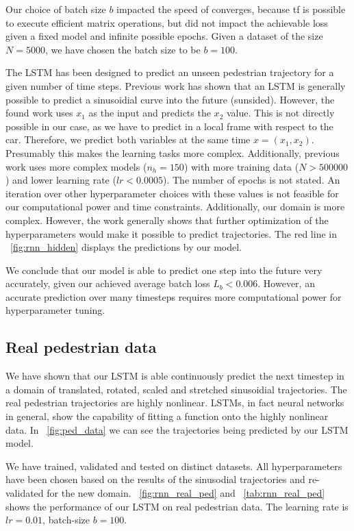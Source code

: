 Our choice of batch size $b$ impacted the speed of converges, because tf is possible to execute efficient matrix operations, but did not impact the achievable loss given a fixed model and infinite possible epochs. Given a dataset of the size $N=5000$, we have chosen the batch size to be $b=100$.

The LSTM has been designed to predict an unseen pedestrian trajectory for a given number of time steps. Previous work has shown that an LSTM is generally possible to predict a sinusoidial curve into the future (sunsided). However, the found work uses $x_1$ as the input and predicts the $x_2$ value. This is not directly possible in our case, as we have to predict in a local frame with respect to the car. Therefore, we predict both variables at the same time $x = (x_1, x_2)$. Presumably this makes the learning tasks more complex. Additionally, previous work uses more complex models ($n_h=150$) with more training data ($N>500000$) and lower learning rate ($lr<0.0005$). The number of epochs is not stated. An iteration over other hyperparameter choices with these values is not feasible for our computational power and time constraints. Additionally, our domain is more complex. However, the work generally shows that further optimization of the hyperparameters would make it possible to predict trajectories. The red line in ~\cref{fig:rnn_hidden} displays the predictions by our model. 

We conclude that our model is able to predict one step into the future very accurately, given our achieved average batch loss $L_b<0.006$. However, an accurate prediction over many timesteps requires more computational power for hyperparameter tuning. 

\subsection{Real pedestrian data}

We have shown that our LSTM is able continuously predict the next timestep in a domain of translated, rotated, scaled and stretched sinusoidial trajectories. The real pedestrian trajectories are highly nonlinear. LSTMs, in fact neural networks in general, show the capability of fitting a function onto the highly nonlinear data. In ~\cref{fig:ped_data} we can see the trajectories being predicted by our LSTM model.

We have trained, validated and tested on distinct datasets. All hyperparameters have been chosen based on the results of the sinusodial trajectories and re-validated for the new domain. ~\cref{fig:rnn_real_ped} and ~\cref{tab:rnn_real_ped} shows the performance of our LSTM on real pedestrian data. The learning rate is $lr=0.01$, batch-size $b=100$. 

